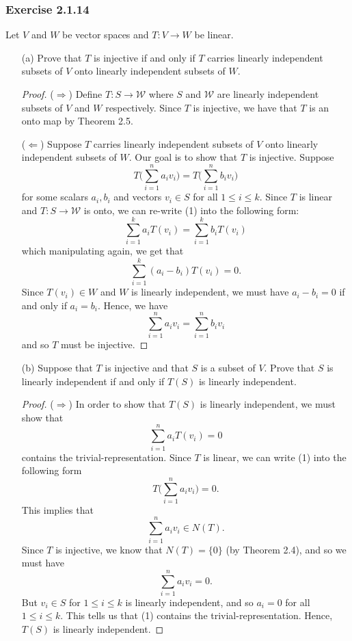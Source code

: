 \subsubsection{Exercise 2.1.14} Let \( V \) and \( W \) be vector spaces and \( T: V \to W  \) be linear.
\begin{enumerate}
    \item[(a)] Prove that \( T \) is injective if and only if \( T  \) carries linearly independent subsets of \( V  \) onto linearly independent subsets of \( W  \).
        \begin{proof}
            (\( \Rightarrow \)) Define \( T: S \to \mathcal{W} \) where \( S  \) and \( \mathcal{W} \) are linearly independent subsets of \( V \) and \( W  \) respectively. Since \( T  \) is injective, we have that \( T  \) is an onto map by Theorem 2.5. 

            (\( \Leftarrow \)) Suppose \( T  \) carries linearly independent subsets of \( V  \) onto linearly independent subsets of \( W  \). Our goal is to show that \( T \) is injective. Suppose  
            \[  T \Big( \sum_{ i=1 }^{ n } a_{i} v_{i}  \Big) = T \Big( \sum_{ i=1 }^{ n } b_{i} v_{i} \Big) \tag{1} \]
            for some scalars \( a_{i}, b_{i}  \) and vectors \( v_{i} \in S  \) for all \( 1 \leq i \leq  k  \). Since \( T  \) is linear and \( T: S \to \mathcal{W}  \) is onto, we can re-write (1) into the following form:
            \[ \sum_{ i=1 }^{ k  } a_{i} T(v_{i}) = \sum_{ i=1 }^{ k  } b_{i} T(v_{i}) \tag{2}  \]
            which manipulating again, we get that
            \[  \sum_{ i=1 }^{ k  } (a_{i} - b_{i}) T(v_{i}) = 0. \tag{3}  \]
            Since \( T(v_{i}) \in W   \) and \( W  \) is linearly independent, we must have \( a_{i} - b_{i} = 0  \) if and only if \( a_{i} = b_{i} \). Hence, we have
            \[  \sum_{ i=1 }^{ n } a_{i} v_{i} = \sum_{ i=1 }^{ n  } b_{i} v_{i}   \]
            and so \( T  \) must be injective.
        \end{proof}
    \item[(b)] Suppose that \( T  \) is injective and that \( S  \) is a subset of \( V  \). Prove that \( S  \) is linearly independent if and only if \( T(S) \) is linearly independent.
        \begin{proof}
            (\( \Rightarrow \)) In order to show that \( T(S)  \) is linearly independent, we must show that 
            \[  \sum_{ i=1 }^{ n } a_{i} T(v_{i}) = 0   \tag{1} \] contains the trivial-representation. Since \( T  \) is linear, we can write (1) into the following form
            \[  T \Big( \sum_{ i=1 }^{ n } a_{i} v_{i} \Big) = 0. \] 
            This implies that
            \[  \sum_{ i=1 }^{ n } a_{i} v_{i} \in N(T). \]
            Since \( T  \) is injective, we know that \( N(T) = \{ 0  \}   \) (by Theorem 2.4), and so we must have
            \[  \sum_{ i=1 }^{ n } a_{i} v_{i} = 0. \tag{2} \]
            But \( v_{i} \in S  \) for \( 1 \leq i \leq k   \) is linearly independent, and so \( a_{i} = 0  \) for all \( 1 \leq i \leq k  \). This tells us that (1) contains the trivial-representation. Hence, \( T(S)  \) is linearly independent.


\end{proof}
\end{enumerate}
